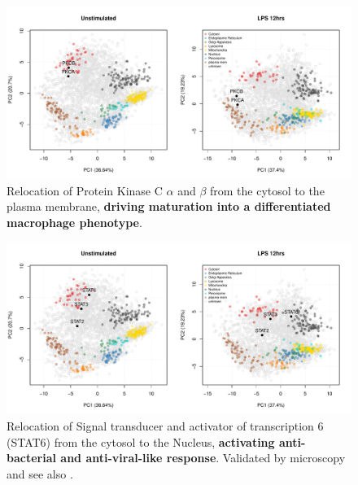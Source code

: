 \begin{frame}
  \begin{figure}[h]
    \centering
    \includegraphics[width=\linewidth]{./figs_all/lps-pkc.pdf}
    \caption{Relocation of Protein Kinase C $\alpha$ and $\beta$ from the
      cytosol to the plasma membrane, \textbf{driving maturation into
        a differentiated macrophage phenotype}.}
  \end{figure}
\end{frame}

\begin{frame}
  \begin{figure}[h]
    \centering
    \includegraphics[width=\linewidth]{./figs_all/lps-stat.pdf}
    \caption{Relocation of Signal transducer and activator of
      transcription 6 (STAT6) from the cytosol to the Nucleus,
      \textbf{activating anti-bacterial and anti-viral-like
        response}. Validated by microscopy and see also
      \cite{Chen:2011}.}
  \end{figure}
\end{frame}
